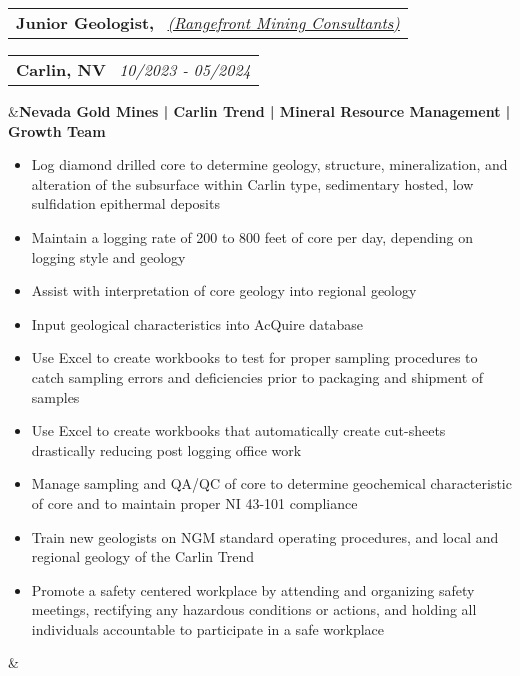 \documentclass[11pt,a4paper,sans]{moderncv}
\makeatletter
\newcommand*{\customcventry}[7][.13em]{
\begin{tabular}{@{}l}
{\bfseries #4} \
{\itshape #3}
\end{tabular}
\hfill
\begin{tabular}{l@{}}
{\bfseries #5} \
{\itshape #2}
\end{tabular}
\ifx&#7&%
\else{\
\begin{minipage}{\maincolumnwidth}%
\small#7%
\end{minipage}}\fi%
\par\addvspace{#1}}
\makeatother
\begin{document}
\customcventry{10/2023 ‐ 05/2024}{{\color{blue}\href{https://www.rangefront.com/}{(Rangefront Mining Consultants)}}}{Junior Geologist,}{Carlin, NV}{}{\textbf{Nevada Gold Mines | Carlin Trend | Mineral Resource Management | Growth Team}
\vspace{-1mm}
{\begin{itemize}[noitemsep, leftmargin=0.6cm, label={\textbullet}]
\item Log diamond drilled core to determine geology, structure, mineralization, and alteration of the subsurface within Carlin type, sedimentary hosted, low sulfidation epithermal deposits 
\item Maintain a logging rate of 200 to 800 feet of core per day, depending on logging style and geology
\item Assist with interpretation of core geology into regional geology 
\item Input geological characteristics into AcQuire database 
\item Use Excel to create workbooks to test for proper sampling procedures to catch sampling errors and deficiencies prior to packaging and shipment of samples
\item Use Excel to create workbooks that automatically create cut-sheets drastically reducing post logging office work 
\item Manage sampling and QA/QC of core to determine geochemical characteristic of core and to maintain proper NI 43-101 compliance
\item Train new geologists on NGM standard operating procedures, and local and regional geology of the Carlin Trend
\item Promote a safety centered workplace by attending and organizing safety meetings, rectifying any hazardous conditions or actions, and holding all individuals accountable to participate in a safe workplace
\end{itemize}}}
\end{document}
